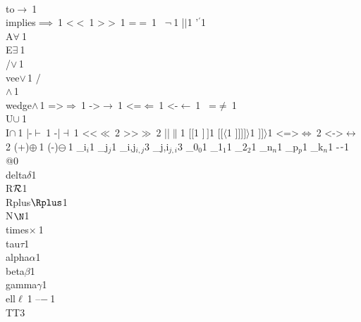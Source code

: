 {        {\\to}{{$\to\ $}}1
        {\\implies}{{$\implies\ $}}1
        {<}{{$<\ $}}1
        {>}{{$>\ $}}1
        {=}{{$=\ $}}1
        {~}{{$\neg\ $}}1
        {|}{{$\mid$}}1
        {'}{{$^\prime$}}1
        {\\A}{{$\forall\ $}}1
        {\\E}{{$\exists\ $}}1
        {\\/}{{$\vee\,$}}1
        {\\vee}{{$\vee\,$}}1
        {/\\}{{$\wedge\,$}}1
        {\\wedge}{{$\wedge\,$}}1
        {=>}{{$\Rightarrow\ $}}1
        {->}{{$\rightarrow\ $}}1
        {<=}{{$\Leftarrow\ $}}1
        {<-}{{$\leftarrow\ $}}1
        {~=}{{$\neq\ $}}1
        {\\U}{{$\cup\ $}}1
        {\\I}{{$\cap\ $}}1
        {|-}{{$\vdash\ $}}1
        {-|}{{$\dashv\ $}}1
        {<<}{{$\ll\ $}}2
        {>>}{{$\gg\ $}}2
        {||}{{$\|$}}1
        {[}{{$[$}}1
        {]}{{$\,]$}}1
        {[[}{{$\langle$}}1
        {]]]}{{$]\rangle$}}1
        {]]}{{$\rangle$}}1
        {<=>}{{$\Leftrightarrow\ $}}2
        {<->}{{$\leftrightarrow\ $}}2
        {(+)}{{$\oplus\ $}}1
        {(-)}{{$\ominus\ $}}1
        {_i}{{$_{i}$}}1
        {_j}{{$_{j}$}}1
        {_{i,j}}{{$_{i,j}$}}3
        {_{j,i}}{{$_{j,i}$}}3
        {_0}{{$_0$}}1
        {_1}{{$_1$}}1
        {_2}{{$_2$}}1
        {_n}{{$_n$}}1
        {_p}{{$_p$}}1
        {_k}{{$_n$}}1
        {-}{{$\ms{-}$}}1
        {@}{{}}0
        {\\delta}{{$\delta$}}1
        {\\R}{{${\cal R}$}}1
        {\\Rplus}{{$\Rplus$}}1
        {\\N}{{$\N$}}1
        {\\times}{{$\times\ $}}1
        {\\tau}{{$\tau$}}1
        {\\alpha}{{$\alpha$}}1
        {\\beta}{{$\beta$}}1
        {\\gamma}{{$\gamma$}}1
        {\\ell}{{$\ell\ $}}1
        {--}{{$-\ $}}1
        {\\TT}{{\hspace{1.5em}}}3        
      }

